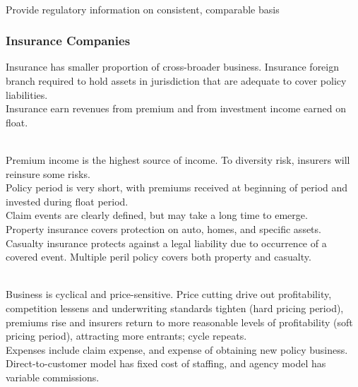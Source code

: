 \begin{remark} \\
Provide regulatory information on consistent, comparable basis
\end{remark}

\subsubsection{Insurance Companies}

Insurance has smaller proportion of cross-broader business. Insurance foreign branch required to hold assets in jurisdiction that are adequate to cover policy liabilities.\\
Insurance earn revenues from premium and from investment income earned on float.

\begin{remark} \\
Premium income is the highest source of income. To diversity risk, insurers will reinsure some risks.\\
Policy period is very short, with premiums received at beginning of period and invested during float period.\\
Claim events are clearly defined, but may take a long time to emerge.\\
Property insurance covers protection on auto, homes, and specific assets. Casualty insurance protects against a legal liability due to occurrence of a covered event. Multiple peril policy covers both property and casualty.
\end{remark}

\begin{remark} \\
Business is cyclical and price-sensitive. Price cutting drive out profitability, competition lessens and underwriting standards tighten (hard pricing period), premiums rise and insurers return to more reasonable levels of profitability (soft pricing period), attracting more entrants; cycle repeats.\\
Expenses include claim expense, and expense of obtaining new policy business. Direct-to-customer model has fixed cost of staffing, and agency model has variable commissions.
\end{remark}

